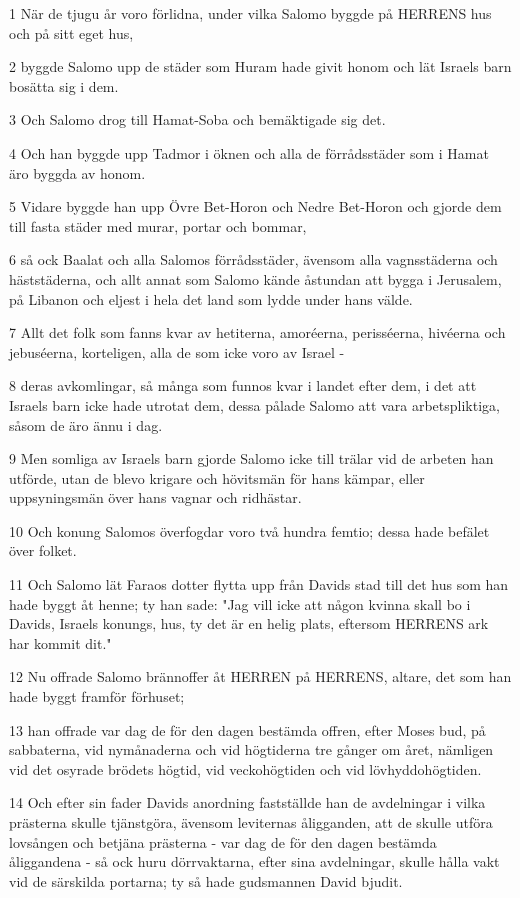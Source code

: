 \par 1 När de tjugu år voro förlidna, under vilka Salomo byggde på HERRENS hus och på sitt eget hus,
\par 2 byggde Salomo upp de städer som Huram hade givit honom och lät Israels barn bosätta sig i dem.
\par 3 Och Salomo drog till Hamat-Soba och bemäktigade sig det.
\par 4 Och han byggde upp Tadmor i öknen och alla de förrådsstäder som i Hamat äro byggda av honom.
\par 5 Vidare byggde han upp Övre Bet-Horon och Nedre Bet-Horon och gjorde dem till fasta städer med murar, portar och bommar,
\par 6 så ock Baalat och alla Salomos förrådsstäder, ävensom alla vagnsstäderna och häststäderna, och allt annat som Salomo kände åstundan att bygga i Jerusalem, på Libanon och eljest i hela det land som lydde under hans välde.
\par 7 Allt det folk som fanns kvar av hetiterna, amoréerna, perisséerna, hivéerna och jebuséerna, korteligen, alla de som icke voro av Israel -
\par 8 deras avkomlingar, så många som funnos kvar i landet efter dem, i det att Israels barn icke hade utrotat dem, dessa pålade Salomo att vara arbetspliktiga, såsom de äro ännu i dag.
\par 9 Men somliga av Israels barn gjorde Salomo icke till trälar vid de arbeten han utförde, utan de blevo krigare och hövitsmän för hans kämpar, eller uppsyningsmän över hans vagnar och ridhästar.
\par 10 Och konung Salomos överfogdar voro två hundra femtio; dessa hade befälet över folket.
\par 11 Och Salomo lät Faraos dotter flytta upp från Davids stad till det hus som han hade byggt åt henne; ty han sade: "Jag vill icke att någon kvinna skall bo i Davids, Israels konungs, hus, ty det är en helig plats, eftersom HERRENS ark har kommit dit."
\par 12 Nu offrade Salomo brännoffer åt HERREN på HERRENS, altare, det som han hade byggt framför förhuset;
\par 13 han offrade var dag de för den dagen bestämda offren, efter Moses bud, på sabbaterna, vid nymånaderna och vid högtiderna tre gånger om året, nämligen vid det osyrade brödets högtid, vid veckohögtiden och vid lövhyddohögtiden.
\par 14 Och efter sin fader Davids anordning fastställde han de avdelningar i vilka prästerna skulle tjänstgöra, ävensom leviternas åligganden, att de skulle utföra lovsången och betjäna prästerna - var dag de för den dagen bestämda åliggandena - så ock huru dörrvaktarna, efter sina avdelningar, skulle hålla vakt vid de särskilda portarna; ty så hade gudsmannen David bjudit.
